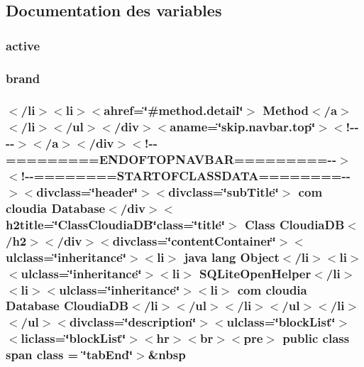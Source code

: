 \subsection{Documentation des variables}
\hypertarget{_cloudia_d_b_8html_aaebf392084a5bb0210fa5b154954895b}{
\subsubsection[{active}]{\setlength{\rightskip}{0pt plus 5cm}active}}\label{_cloudia_d_b_8html_aaebf392084a5bb0210fa5b154954895b}
\hypertarget{_cloudia_d_b_8html_ab22a03099a4511106733f08173c9061f}{
\subsubsection[{brand}]{\setlength{\rightskip}{0pt plus 5cm}brand}}\label{_cloudia_d_b_8html_ab22a03099a4511106733f08173c9061f}
\hypertarget{_cloudia_d_b_8html_a74635474ad7afca61e46f73c1451271c}{
\subsubsection[{class}]{\setlength{\rightskip}{0pt plus 5cm}$<$/li$>$$<$li$>$$<$ahref=\char`\"{}\#method.\-detail\char`\"{}$>$ Method$<$/{\bf a}$>$$<$/li$>$$<$/ul$>$$<$/div$>$$<$aname=\char`\"{}skip.\-navbar.\-top\char`\"{}$>$$<$!-\/-\/-\/-\/$>$$<$/a$>$$<$/div$>$$<$!-\/-\/=========E\-N\-D\-O\-F\-T\-O\-P\-N\-A\-V\-B\-A\-R=========-\/-\/$>$$<$!-\/-\/========S\-T\-A\-R\-T\-O\-F\-C\-L\-A\-S\-S\-D\-A\-T\-A========-\/-\/$>$$<$divclass=\char`\"{}header\char`\"{}$>$$<$divclass=\char`\"{}sub\-Title\char`\"{}$>$ com cloudia Database$<$/div$>$$<$h2title=\char`\"{}Class\-Cloudia\-D\-B\char`\"{}class=\char`\"{}title\char`\"{}$>$ Class {\bf Cloudia\-D\-B}$<$/h2$>$$<$/div$>$$<$divclass=\char`\"{}content\-Container\char`\"{}$>$$<$ulclass=\char`\"{}inheritance\char`\"{}$>$$<$li$>$ java lang Object$<$/li$>$$<$li$>$$<$ulclass=\char`\"{}inheritance\char`\"{}$>$$<$li$>$ S\-Q\-Lite\-Open\-Helper$<$/li$>$$<$li$>$$<$ulclass=\char`\"{}inheritance\char`\"{}$>$$<$li$>$ com cloudia Database {\bf Cloudia\-D\-B}$<$/li$>$$<$/ul$>$$<$/li$>$$<$/ul$>$$<$/li$>$$<$/ul$>$$<$divclass=\char`\"{}description\char`\"{}$>$$<$ulclass=\char`\"{}block\-List\char`\"{}$>$$<$liclass=\char`\"{}block\-List\char`\"{}$>$$<$hr$>$$<$br$>$$<$pre$>$ public class {\bf span} class = \char`\"{}tab\-End\char`\"{}$>$\&nbsp}}\label{_cloudia_d_b_8html_a74635474ad7afca61e46f73c1451271c}
